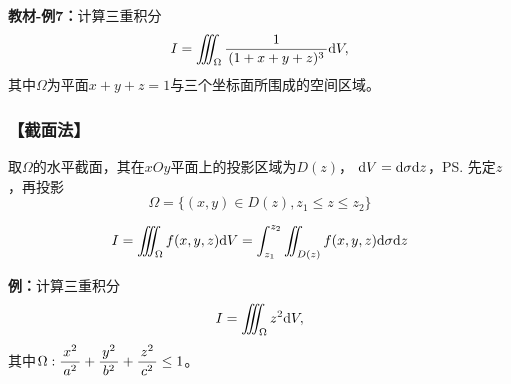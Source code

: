 {\bf 教材-例7：}计算三重积分
$$I=\iiint_{\Omega}\displaystyle\frac{\,{1}\,}{\,{(1+x+y+z)^3}\,}\mathrm{d} V,$$
其中$\Omega$为平面$x+y+z=1$与三个坐标面所围成的空间区域。

\subsubsection{【截面法】}

取$\Omega$的水平截面，其在$xOy$平面上的投影区域为$D(z)$，
$\mathrm{d} V=\mathrm{d}\sigma \mathrm{d} z$，\ps{先定$z$，再投影}
$$\Omega=\{(x,y)\in D(z),z_1\leq z\leq z_2\}$$

\begin{center}
\end{center}

$${I=\iiint_{\Omega}f(x,y,z)\mathrm{d}
V=\int_{z_1}^{z_2}\iint_{D(z)}f(x,y,z)\mathrm{d}\sigma \mathrm{d} z}$$

{\bf 例：}计算三重积分
$$I=\iiint_{\Omega}z^2\mathrm{d} V,$$
其中$\Omega:\displaystyle\frac{\,{x^2}\,}{\,{a^2}\,}+\displaystyle\frac{\,{y^2}\,}{\,{b^2}\,}+\displaystyle\frac{\,{z^2}\,}{\,{c^2}\,}\leq 1$。

